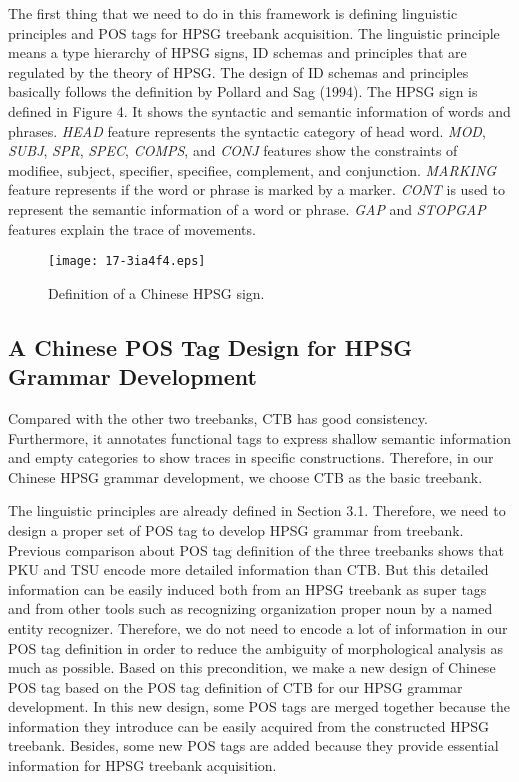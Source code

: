 \documentclass[english]{jnlp_1.4}
\begin{document}
The first thing that we need to do in this framework is defining linguistic 
principles and POS tags for HPSG treebank acquisition. The linguistic 
principle means a type hierarchy of HPSG signs, ID schemas and principles 
that are regulated by the theory of HPSG. The design of ID schemas and 
principles basically follows the definition by Pollard and Sag (1994). The 
HPSG sign is defined in Figure 4. It shows the syntactic and semantic 
information of words and phrases. \textit{HEAD} feature represents the syntactic category 
of head word. \textit{MOD}, \textit{SUBJ}, \textit{SPR}, \textit{SPEC}, \textit{COMPS}, and \textit{CONJ} features show the constraints of modifiee, 
subject, specifier, specifiee, complement, and conjunction. \textit{MARKING} feature 
represents if the word or phrase is marked by a marker. \textit{CONT} is used to 
represent the semantic information of a word or phrase. \textit{GAP} and \textit{STOPGAP} features 
explain the trace of movements. 


\begin{figure}[t]
\begin{center}
\texttt{[image: 17-3ia4f4.eps]}
\end{center}
\caption{Definition of a Chinese HPSG sign.} 
\end{figure}


\subsection{A Chinese POS Tag Design for HPSG Grammar Development}

Compared with the other two treebanks, CTB has good consistency. 
Furthermore, it annotates functional tags to express shallow semantic 
information and empty categories to show traces in specific constructions. 
Therefore, in our Chinese HPSG grammar development, we choose CTB as the 
basic treebank. 

The linguistic principles are already defined in Section 3.1. Therefore, we 
need to design a proper set of POS tag to develop HPSG grammar from 
treebank. Previous comparison about POS tag definition of the three 
treebanks shows that PKU and TSU encode more detailed information than CTB. 
But this detailed information can be easily induced both from an HPSG 
treebank as super tags and from other tools such as recognizing organization 
proper noun by a named entity recognizer. Therefore, we do not need to 
encode a lot of information in our POS tag definition in order to reduce the 
ambiguity of morphological analysis as much as possible. Based on this 
precondition, we make a new design of Chinese POS tag based on the POS tag 
definition of CTB for our HPSG grammar development. In this new design, some 
POS tags are merged together because the information they introduce can be 
easily acquired from the constructed HPSG treebank. Besides, some new POS 
tags are added because they provide essential information for HPSG treebank 
acquisition.
\end{document}
